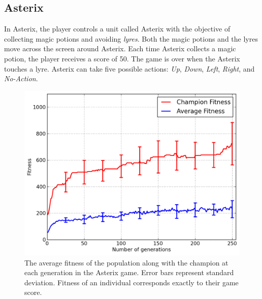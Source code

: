 \documentclass{acm_proc_article-sp}
\begin{document}
\subsection {Asterix}
In Asterix, the player controls a unit called Asterix with the objective of collecting magic potions and avoiding \textit{lyres}. Both the magic potions and the lyres move across the screen around Asterix. Each time Asterix collects a magic potion, the player receives a score of 50. The game is over when the Asterix touches a lyre. Asterix can take five possible actions: \textit{Up}, \textit{Down}, \textit{Left}, \textit{Right}, and \textit{No-Action}.

\begin{figure}[ht]
\begin{center}
\includegraphics[width=\columnwidth]{figures/asterix-results.png}
\end{center}
\caption{The average fitness of the population along with the champion at each generation in the Asterix game. Error bars represent standard deviation. Fitness of an individual corresponds exactly to their game score.}
\label{fig:asterix-curve}
\end{figure}
\end{document}
